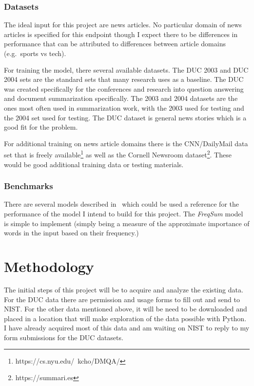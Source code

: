 \documentclass{article}
\begin{document}
\subsubsection{Datasets}

The ideal input for this project are news articles. No particular domain of news
articles is specified for this endpoint though I expect there to be differences
in performance that can be attributed to differences between article domains
(e.g.\ sports vs tech).

For training the model, there several available datasets. The DUC 2003 and DUC
2004 sets are the standard sets that many research uses as a baseline. The DUC
was created specifically for the conferences and research into question
answering and document summarization specifically. The 2003 and 2004 datasets
are the ones most often used in summarization work, with the 2003 used for
testing and the 2004 set used for testing. The DUC dataset is general news
stories which is a good fit for the problem.

For additional training on news article domains there is the CNN/DailyMail data
set that is freely available\footnote{https://cs.nyu.edu/~kcho/DMQA/} as well as the
Cornell Newsroom dataset\footnote{https://summari.es}. These would be good additional
training data or testing materials.

\subsubsection{Benchmarks}
There are several models described in\ \cite{CPBL} which could be used a
reference for the performance of the model I intend to build for this project.
The \emph{FreqSum} model is simple to implement (simply being a measure of
the approximate importance of words in the input based on their frequency.)

\section{Methodology}

The initial steps of this project will be to acquire and analyze the existing
data. For the DUC data there are permission and usage forms to fill out and send
to NIST\@. For the other data mentioned above, it will be need to be downloaded
and placed in a location that will make exploration of the data possible with
Python. I have already acquired most of this data and am waiting on NIST to
reply to my form submissions for the DUC datasets.
\end{document}
